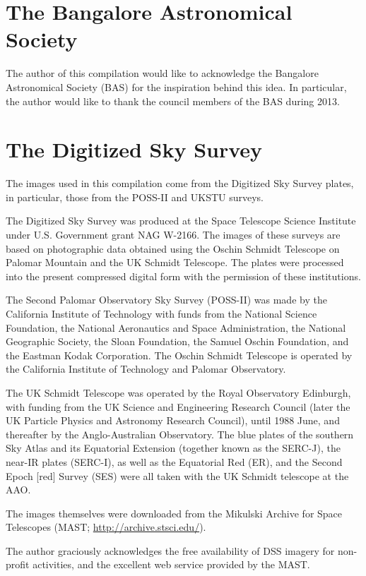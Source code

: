\section*{The Bangalore Astronomical Society}
The author of this compilation would like to acknowledge the Bangalore
Astronomical Society (BAS) for the inspiration behind this idea. In
particular, the author would like to thank the council members of the
BAS during 2013.

\section*{The Digitized Sky Survey}
The images used in this compilation come from the Digitized Sky Survey
plates, in particular, those from the POSS-II and UKSTU surveys.

The Digitized Sky Survey was produced at the Space Telescope Science
Institute under U.S. Government grant NAG W-2166. The images of these
surveys are based on photographic data obtained using the Oschin
Schmidt Telescope on Palomar Mountain and the UK Schmidt
Telescope. The plates were processed into the present compressed
digital form with the permission of these institutions.

The Second Palomar Observatory Sky Survey (POSS-II) was made by the
California Institute of Technology with funds from the National
Science Foundation, the National Aeronautics and Space Administration,
the National Geographic Society, the Sloan Foundation, the Samuel
Oschin Foundation, and the Eastman Kodak Corporation. The Oschin
Schmidt Telescope is operated by the California Institute of
Technology and Palomar Observatory.

The UK Schmidt Telescope was operated by the Royal Observatory
Edinburgh, with funding from the UK Science and Engineering Research
Council (later the UK Particle Physics and Astronomy Research
Council), until 1988 June, and thereafter by the Anglo-Australian
Observatory. The blue plates of the southern Sky Atlas and its
Equatorial Extension (together known as the SERC-J), the near-IR
plates (SERC-I), as well as the Equatorial Red (ER), and the Second
Epoch [red] Survey (SES) were all taken with the UK Schmidt telescope
at the AAO.

The images themselves were downloaded from the Mikulski Archive for
Space Telescopes (MAST; \url{http://archive.stsci.edu/}).

The author graciously acknowledges the free availability of DSS
imagery for non-profit activities, and the excellent web service
provided by the MAST.

